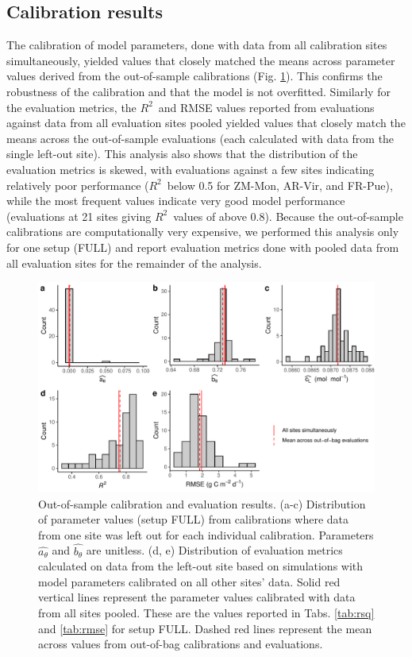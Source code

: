 \documentclass[gmd, manuscript]{copernicus}
\newcommand{\rsq}{$R^2$}
\begin{document}
\subsection{Calibration results}
\label{sec:results_calib}

The calibration of model parameters, done with data from all calibration sites simultaneously, yielded values that closely matched the means across parameter values derived from the out-of-sample calibrations (Fig. \ref{fig:oob}). This confirms the robustness of the calibration and that the model is not overfitted. Similarly for the evaluation metrics, the \rsq\ and RMSE values reported from evaluations against data from all evaluation sites pooled yielded values that closely match the means across the out-of-sample evaluations (each calculated with data from the single left-out site). This analysis also shows that the distribution of the evaluation metrics is skewed, with evaluations against a few sites indicating relatively poor performance (\rsq\ below 0.5 for ZM-Mon, AR-Vir, and FR-Pue), while the most frequent values indicate very good model performance (evaluations at 21 sites giving \rsq\ values of above 0.8). Because the out-of-sample calibrations are computationally very expensive, we performed this analysis only for one setup (FULL) and report evaluation metrics done with pooled data from all evaluation sites for the remainder of the analysis. 

\begin{figure}[!ht]
    \includegraphics[width=\textwidth]{fig/oob_grid.pdf}
    \caption{Out-of-sample calibration and evaluation results. (a-c) Distribution of parameter values (setup FULL) from calibrations where data from one site was left out for each individual calibration. Parameters $\widehat{a_\theta}$ and $\widehat{b_\theta}$ are unitless. (d, e) Distribution of evaluation metrics calculated on data from the left-out site based on simulations with model parameters calibrated on all other sites' data. Solid red vertical lines represent the parameter values calibrated with data from all sites pooled. These are the values reported in Tabs. \ref{tab:rsq} and \ref{tab:rmse} for setup FULL. Dashed red lines represent the mean across values from out-of-bag calibrations and evaluations.}
    \label{fig:oob}
\end{figure}
\end{document}

